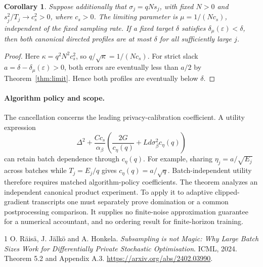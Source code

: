 \documentclass[a4paper,11pt]{article}
\newtheorem{corollary}{Corollary}
\begin{document}
\begin{corollary}\label{cor:clock}
Suppose additionally that $\sigma_j=qNs_j$, with fixed $N>0$ and $s_j^2/T_j\to c_s^2>0$, where $c_s>0$. The limiting parameter is $\mu=1/(Nc_s)$, independent of the fixed sampling rate. If a fixed target $\delta$ satisfies $\delta_\mu(\varepsilon)<\delta$, then both canonical directed profiles are at most $\delta$ for all sufficiently large $j$.
\end{corollary}
\begin{proof}
Here $\kappa=q^2N^2c_s^2$, so $q/\sqrt\kappa=1/(Nc_s)$. For strict slack $a=\delta-\delta_\mu(\varepsilon)>0$, both errors are eventually less than $a/2$ by Theorem~\ref{thm:limit}. Hence both profiles are eventually below $\delta$.
\end{proof}

\paragraph{Algorithm policy and scope.}
The cancellation concerns the leading privacy-calibration coefficient. A utility expression
\[
 \Delta^2+\frac{Cc_s}{\alpha_\beta}
 \left(\frac{2G}{c_\eta(q)}+Ld\sigma_\beta^2c_\eta(q)\right)
\]
can retain batch dependence through $c_\eta(q)$. For example, sharing $\eta_j=a/\sqrt{E_j}$ across batches while $T_j=E_j/q$ gives $c_\eta(q)=a/\sqrt q$. Batch-independent utility therefore requires matched algorithm-policy coefficients. The theorem analyzes an independent canonical product experiment. To apply it to adaptive clipped-gradient transcripts one must separately prove domination or a common postprocessing comparison. It supplies no finite-noise approximation guarantee for a numerical accountant, and no ordering result for finite-horizon training.

\begin{thebibliography}{1}
O. R\"ais\"a, J. J\"alk\"o and A. Honkela.
\emph{Subsampling is not Magic: Why Large Batch Sizes Work for Differentially Private Stochastic Optimisation}.
ICML, 2024. Theorem 5.2 and Appendix A.3.
\url{https://arxiv.org/abs/2402.03990}.
\end{thebibliography}
\end{document}
